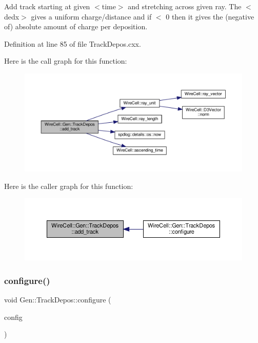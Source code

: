 Add track starting at given $<$time$>$ and stretching across given ray. The $<$dedx$>$ gives a uniform charge/distance and if $<$ 0 then it gives the (negative of) absolute amount of charge per deposition. 

Definition at line 85 of file Track\+Depos.\+cxx.

Here is the call graph for this function\+:
\nopagebreak
\begin{figure}[H]
\begin{center}
\leavevmode
\includegraphics[width=350pt]{class_wire_cell_1_1_gen_1_1_track_depos_adae13601f092202fbdc66c3d0be8be8a_cgraph}
\end{center}
\end{figure}
Here is the caller graph for this function\+:
\nopagebreak
\begin{figure}[H]
\begin{center}
\leavevmode
\includegraphics[width=350pt]{class_wire_cell_1_1_gen_1_1_track_depos_adae13601f092202fbdc66c3d0be8be8a_icgraph}
\end{center}
\end{figure}
\mbox{\label{class_wire_cell_1_1_gen_1_1_track_depos_a0a3e984c40fe60a0b8fbd451091a008b}} 
\subsubsection{\texorpdfstring{configure()}{configure()}}
{\footnotesize\ttfamily void Gen\+::\+Track\+Depos\+::configure (\begin{DoxyParamCaption}\item[{const \hyperlink{namespace_wire_cell_a9f705541fc1d46c608b3d32c182333ee}{Wire\+Cell\+::\+Configuration} \&}]{config }\end{DoxyParamCaption})\hspace{0.3cm}{\ttfamily [virtual]}}



